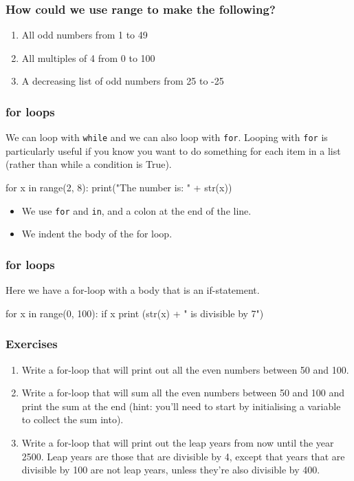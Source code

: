 \documentclass{beamer}
\begin{document}
\begin{frame}
\frametitle{How could we use range to make the following?}
\begin{enumerate}
\item All odd numbers from 1 to 49
\item All multiples of 4 from 0 to 100
\item A decreasing list of odd numbers from 25 to -25
\end{enumerate}
\end{frame}

\begin{frame}[fragile]
\frametitle{for loops}
We can loop with \texttt{while} and we can also loop with \texttt{for}.
Looping with \texttt{for} is particularly useful if you know you
want to do something for each item in a list (rather than
while a condition is True).
\begin{code}
for x in range(2, 8):
   print("The number is: " + str(x))
\end{code}
\begin{itemize}
\item We use \texttt{for} and \texttt{in}, and a colon at the end of the line.
\item We indent the body of the for loop.
\end{itemize}
\end{frame}


\begin{frame}[fragile]
\frametitle{for loops}
Here we have a for-loop with a body that is an if-statement.
\bigskip
\begin{code}
for x in range(0, 100):
   if x %
   print (str(x) + " is divisible by 7")
\end{code}
\end{frame}

\begin{frame}
\frametitle{Exercises}
\begin{enumerate}
\item Write a for-loop that will print out all the even numbers
between 50 and 100.
\item Write a for-loop that will sum all the even numbers
between 50 and 100 and print the sum at the end (hint:
you'll need to start by initialising a variable to collect the
sum into).
\item Write a for-loop that will print out the leap years from
now until the year 2500. Leap years are those that are
divisible by 4, except that years that are divisible by 100
are not leap years, unless they're also divisible by 400.
\end{enumerate}
\end{frame}
\end{document}
